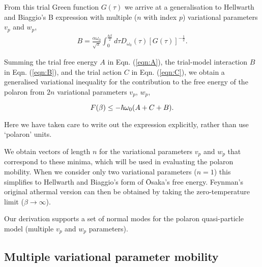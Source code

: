 From this trial Green function $G(\tau)$ we arrive at a generalisation to Hellwarth and Biaggio's B expression with multiple ($n$ with index $p$) variational parameters $v_{p}$ and $w_{p}$, 
\begin{equation}
\begin{gathered}
    B = \frac{\alpha \omega_0}{\sqrt{\pi}} \int_0^{\frac{\hbar\beta}{2}} d\tau D_{\omega_0}(\tau) \left[ G(\tau) \right]^{-\frac{1}{2}} .
\label{eqn:B}
\end{gathered}
\end{equation}

Summing the trial free energy $A$ in Eqn. (\ref{eqn:A}), the trial-model interaction $B$ in Eqn. (\ref{eqn:B}), and the trial action $C$ in Eqn. (\ref{eqn:C}), we obtain a generalised variational inequality for the contribution to the free energy of the polaron from $2n$ variational parameters $v_{p}$, $w_{p}$, 

\begin{equation}\label{eqn:multi_feynman_jensen}
        F(\beta) \leq - \hbar \omega_0 (A + C + B) . \\
\end{equation}

Here we have taken care to write out the expression explicitly, rather than use `polaron' units. 
\newline

We obtain vectors of length $n$ for the variational parameters $v_{p}$ and $w_{p}$ that correspond to these minima, which will be used in evaluating the polaron mobility. When we consider only two variational parameters ($n = 1$) this simplifies to Hellwarth and Biaggio's form of \=Osaka's free energy. Feynman's original athermal version can then be obtained by taking the zero-temperature limit ($\beta \rightarrow \infty$).
\newline

Our derivation supports a set of normal modes for the polaron quasi-particle model (multiple $v_{p}$ and $w_{p}$ parameters).

\subsection{Multiple variational parameter mobility}

